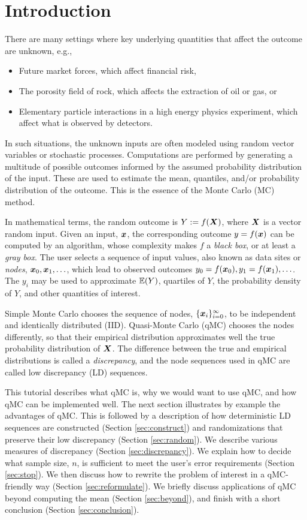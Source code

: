 \documentclass{svproc}
\newcounter{algorithm}%
\begin{document}
\section{Introduction} \label{sec:intro}
There are many settings where key underlying quantities that affect the outcome are unknown, e.g.,
\begin{itemize}
	\item Future market forces, which affect financial risk,
	\item The porosity field of rock, which affects the extraction of oil or gas, or
	\item Elementary particle interactions in a high energy physics experiment, which affect what is observed by detectors.
\end{itemize}
In such situations, the unknown inputs are often modeled using random vector variables or stochastic processes.  Computations are performed by generating a multitude of possible outcomes informed by the assumed probability distribution of the input. These are used to estimate the mean, quantiles, and/or probability distribution of the outcome.  This is the essence of the Monte Carlo (MC) method.

In mathematical terms, the random outcome is $Y := f({\boldsymbol{X}})$, where ${\boldsymbol{X}}$ is a vector random input.  Given an input, ${\boldsymbol{x}}$, the corresponding outcome  $y = f({\boldsymbol{x}})$ can be computed by an algorithm, whose complexity makes $f$ a \emph{black box}, or at least a \emph{gray box}.  The user selects a sequence of input values, also known as data sites or \emph{nodes}, ${\boldsymbol{x}}_0, {\boldsymbol{x}}_1, \ldots$, which lead to observed outcomes $y_0 = f({\boldsymbol{x}}_0), y_1 = f({\boldsymbol{x}}_1), \ldots$.  The $y_i$ may be used to approximate ${\mathbb{E}}(Y)$, quartiles of $Y$, the probability density of $Y$, and other quantities of interest.

Simple  Monte Carlo chooses the sequence of nodes, $\{{\boldsymbol{x}}_i\}_{i=0}^\infty$, to be independent and identically distributed (IID).  Quasi-Monte Carlo (qMC)  chooses the nodes differently, so that their empirical distribution approximates well the true probability distribution of ${\boldsymbol{X}}$.  The difference between  the true and empirical distributions is called a \emph{discrepancy}, and the node sequences used in qMC are called low discrepancy (LD) sequences.

This tutorial describes what qMC is, why we would want to use qMC, and how qMC can be implemented well.  The next section illustrates by example the advantages of qMC.  This is followed by a description of how deterministic LD sequences are constructed (Section \ref{sec:construct}) and randomizations that preserve their low discrepancy (Section \ref{sec:random}).  We describe various measures of discrepancy (Section \ref{sec:discrepancy}).  We explain how to decide what sample size, $n$, is sufficient to meet the user's error requirements (Section \ref{sec:stop}).  We then discuss how to rewrite the problem of interest in a qMC-friendly way (Section \ref{sec:reformulate}). We briefly discuss applications of qMC beyond computing the mean (Section \ref{sec:beyond}), and finish with a short conclusion (Section \ref{sec:conclusion}).
\end{document}
